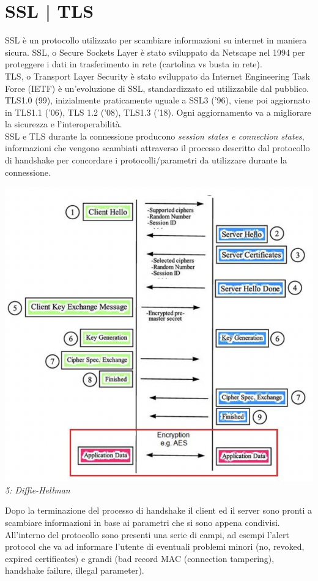 \documentclass[11pt, oneside]{article}   	%
\begin{document}
\section*{SSL | TLS}
SSL è un protocollo utilizzato per scambiare informazioni su internet in maniera sicura. SSL, o Secure Sockets Layer è stato sviluppato da Netscape nel 1994 per proteggere i dati in trasferimento in rete (cartolina vs busta in rete). \\
TLS, o Transport Layer Security è stato sviluppato da Internet Engineering Task Force (IETF) è un'evoluzione di SSL, standardizzato ed utilizzabile dal pubblico.
TLS1.0 (99), inizialmente praticamente uguale a SSL3 ('96), viene poi aggiornato in TLS1.1 ('06), TLS 1.2 ('08), TLS1.3 ('18). Ogni aggiornamento va a migliorare la sicurezza e l'interoperabilità.\\

SSL e TLS durante la connessione producono \emph{session states e connection states}, informazioni che vengono scambiati attraverso il processo descritto dal protocollo di handshake per concordare i protocolli/parametri da utilizzare durante la connessione.
\begin{center}
\includegraphics[scale= 0.6]{tls}\\
\emph{5: Diffie-Hellman}
\end{center}
Dopo la terminazione del processo di handshake il client ed il server sono pronti a scambiare informazioni in base ai parametri che si sono appena condivisi.\\
All'interno del protocollo sono presenti una serie di campi, ad esempi l'alert protocol che va ad informare l'utente di eventuali problemi minori (no, revoked, expired certificates) e grandi (bad record MAC (connection tampering), handshake failure, illegal parameter).
\end{document}
